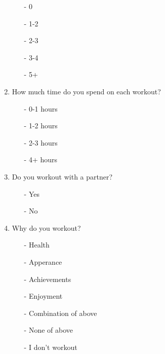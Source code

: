 \documentclass[a4paper]{article}
\begin{document}
\begin{enumerate}
	\begin{itemize}
	      \item[-]{0}
          \item[-]{1-2}
          \item[-]{2-3}
          \item[-]{3-4}
          \item[-]{5+}
	\end{itemize}
\item How much time do you spend on each workout?
	\begin{itemize}
    	  \item[-]{0-1 hours}
          \item[-]{1-2 hours}
	      \item[-]{2-3 hours}
          \item[-]{4+ hours}
	\end{itemize}
\item Do you workout with a partner?	
\begin{itemize}
	      \item[-]{Yes}
          \item[-]{No}
	\end{itemize}
\item Why do you workout?
	\begin{itemize}
          \item[-]{Health}
          \item[-]{Apperance}
          \item[-]{Achievements}
	      \item[-]{Enjoyment}
	      \item[-]{Combination of above}
    	  \item[-]{None of above}
	      \item[-]{I don't workout}
	\end{itemize}
\end{enumerate}


\newpage
\end{document}
